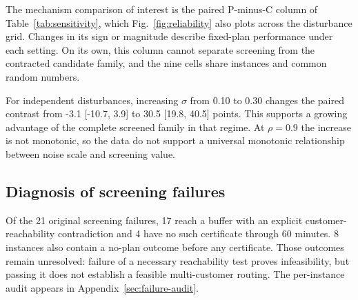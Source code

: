 The mechanism comparison of interest is the paired P-minus-C column of Table~\ref{tab:sensitivity}, which Fig.~\ref{fig:reliability} also plots across the disturbance grid. Changes in its sign or magnitude describe fixed-plan performance under each setting. On its own, this column cannot separate screening from the contracted candidate family, and the nine cells share instances and common random numbers.

For independent disturbances, increasing $\sigma$ from 0.10 to 0.30 changes the paired contrast from -3.1 [-10.7, 3.9] to 30.5 [19.8, 40.5] points. This supports a growing advantage of the complete screened family in that regime. At $\rho=0.9$ the increase is not monotonic, so the data do not support a universal monotonic relationship between noise scale and screening value.

\subsection{Diagnosis of screening failures}

Of the 21 original screening failures, 17 reach a buffer with an explicit customer-reachability contradiction and 4 have no such certificate through 60 minutes. 8 instances also contain a no-plan outcome before any certificate. Those outcomes remain unresolved: failure of a necessary reachability test proves infeasibility, but passing it does not establish a feasible multi-customer routing. The per-instance audit appears in Appendix~\ref{sec:failure-audit}.